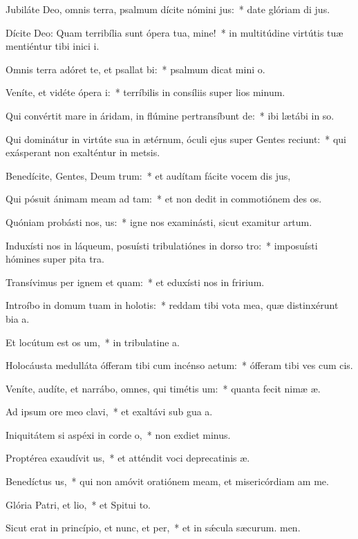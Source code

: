 \item Jubiláte Deo, omnis terra, psalmum dícite nómini jus:~* date glóriam di jus.
\item Dícite Deo: Quam terribília sunt ópera tua, mine!~* in multitúdine virtútis tuæ mentiéntur tibi inici i.
\item Omnis terra adóret te, et psallat bi:~* psalmum dicat mini o.
\item Veníte, et vidéte ópera i:~* terríbilis in consíliis super lios minum.
\item Qui convértit mare in áridam, in flúmine pertransíbunt de:~* ibi lætábi in so.
\item Qui dominátur in virtúte sua in ætérnum, óculi ejus super Gentes reciunt:~* qui exásperant non exalténtur in metsis.
\item Benedícite, Gentes, Deum trum:~* et audítam fácite vocem dis jus,
\item Qui pósuit ánimam meam ad tam:~* et non dedit in commotiónem des os.
\item Quóniam probásti nos, us:~* igne nos examinásti, sicut examitur artum.
\item Induxísti nos in láqueum, posuísti tribulatiónes in dorso tro:~* imposuísti hómines super pita tra.
\item Transívimus per ignem et quam:~* et eduxísti nos in fririum.
\item Introíbo in domum tuam in holotis:~* reddam tibi vota mea, quæ distinxérunt bia a.
\item Et locútum est os um,~* in tribulatine a.
\item Holocáusta medulláta ófferam tibi cum incénso aetum:~* ófferam tibi ves cum cis.
\item Veníte, audíte, et narrábo, omnes, qui timétis um:~* quanta fecit nimæ æ.
\item Ad ipsum ore meo clavi,~* et exaltávi sub gua a.
\item Iniquitátem si aspéxi in corde o,~* non exdiet minus.
\item Proptérea exaudívit us,~* et atténdit voci deprecatinis æ.
\item Benedíctus us,~* qui non amóvit oratiónem meam, et misericórdiam am  me.
\item Glória Patri, et lio,~* et Spitui to.
\item Sicut erat in princípio, et nunc, et per,~* et in sǽcula sæcurum. men.

